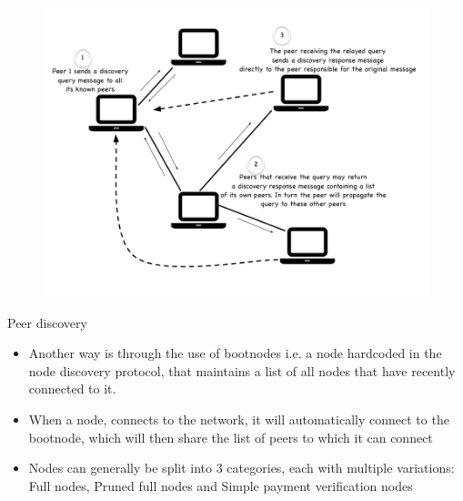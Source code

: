 \documentclass[9pt]{beamer}
\begin{document}

\begin{frame}
	\begin{figure}[]
		\centering
		\includegraphics  [scale=0.3]{Images/p2pdisc}
	\end{figure}
\end{frame}


\begin{frame}{Peer discovery}
	\begin{itemize}
		\item Another way is through the use of bootnodes i.e. a node hardcoded in the node discovery protocol, that maintains a list of all nodes that have recently connected to it.
		\item When a node, connects to the network, it will automatically connect to the bootnode, which will then share the list of peers to which it can connect
		\item Nodes can generally be split into 3 categories, each with multiple variations: Full nodes, Pruned full nodes and Simple payment verification nodes
	\end{itemize}
\end{frame}

\end{document}
